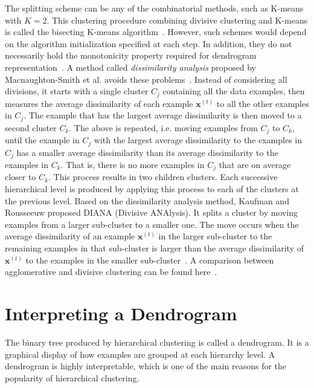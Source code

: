 The splitting scheme can be any of the combinatorial methods, such as K-means with $K=2$. This clustering procedure combining divisive clustering and K-means is called the bisecting K-means algorithm~\cite{Steinbach2000}. However, such schemes would depend on the algorithm initialization specified at each step. In addition, they do not necessarily hold the monotonicity property required for dendrogram representation~\cite{Hastie2009}. A method called \textit{dissimilarity analysis} proposed by Macnaughton-Smith et al. avoids these problems~\cite{Macnaughton-Smith1964}. Instead of considering all divisions, it starts with a single cluster $C_j$ containing all the data examples, then measures the average dissimilarity of each example $\mathbf{x}^{\left( t \right )}$ to all the other examples in $C_j$. The example that has the largest average dissimilarity is then moved to a second cluster $C_k$. The above is repeated, i.e. moving examples from $C_j$ to $C_k$, until the example in $C_j$ with the largest average dissimilarity to the examples in $C_j$ has a smaller average dissimilarity than its average dissimilarity to the examples in $C_k$. That is, there is no more examples in $C_j$ that are on average closer to $C_k$. This process results in two children clusters. Each successive hierarchical level is produced by applying this process to each of the clusters at the previous level. Based on the dissimilarity analysis method, Kaufman and Rousseeuw proposed DIANA (Divisive ANAlysis). It splits a cluster by moving examples from a larger sub-cluster to a smaller one. The move occurs when the average dissimilarity of an example $\mathbf{x}^{\left( t \right )}$ in the larger sub-cluster to the remaining examples in that sub-cluster is larger than the average dissimilarity of $\mathbf{x}^{\left( t \right )}$ to the examples in the smaller sub-cluster~\cite{Kaufman1990}. A comparison between agglomerative and divisive clustering can be found here~\cite{Kumar2020}. 


\section{Interpreting a Dendrogram}
\label{sec:dendro}

The binary tree produced by hierarchical clustering is called a dendrogram. It is a graphical display of how examples are grouped at each hierarchy level. A dendrogram is highly interpretable, which is one of the main reasons for the popularity of hierarchical clustering. 

